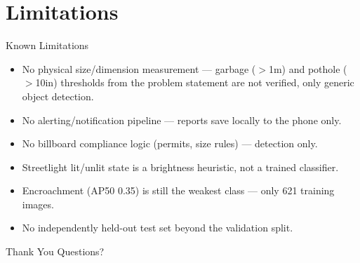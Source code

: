\documentclass[10pt]{beamer}
\begin{document}
\section{Limitations}
\begin{frame}{Known Limitations}
  \begin{itemize}
    \item No physical size/dimension measurement — garbage ($>$1m) and pothole
      ($>$10in) thresholds from the problem statement are not verified, only
      generic object detection.
    \item No alerting/notification pipeline — reports save locally to the phone only.
    \item No billboard compliance logic (permits, size rules) — detection only.
    \item Streetlight lit/unlit state is a brightness heuristic, not a trained classifier.
    \item Encroachment (AP50 0.35) is still the weakest class — only 621 training images.
    \item No independently held-out test set beyond the validation split.
  \end{itemize}
\end{frame}

\begin{frame}{Thank You}
  \centering
  \Large Questions?
\end{frame}
\end{document}
